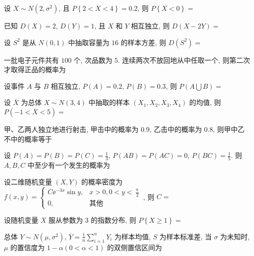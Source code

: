 \begin{ti}
	设 $X\sim N\left(2,\sigma^2\right)$, 且 $P\left\{2<X<4\right\}=0.2$, 则 $P\left\{X<0\right\}=$ \hua{}
\end{ti}

\begin{ti}
	已知 $D(X)=2$, $D(Y)=1$, 且 $X$ 和 $Y$ 相互独立, 则 $D(X-2Y)=$ \hua{}
\end{ti}

\begin{ti}
	设 $S^2$ 是从 $N(0,1)$ 中抽取容量为 $16$ 的样本方差, 则 $D\left(S^2\right)=$ \hua{}
\end{ti}

\begin{ti}
	一批电子元件共有 $100$ 个, 次品数为 $5$. 连续两次不放回地从中任取一个, 则第二次才取得正品的概率为 \hua{}
\end{ti}

\begin{ti}
	设事件 $A$ 与 $B$ 相互独立, $P(A)=0.2$, $P(B)=0.3$, 则 $P\left(A\bigcup B\right)=$ \hua{}
\end{ti}

\begin{ti}
	设 $\overline{X}$ 为总体 $X\sim N(3,4)$ 中抽取的样本 $(X_1,X_2,X_3,X_4)$ 的均值, 则 $P\left(-1<\overline{X}<5\right)=$ \hua{}
\end{ti}

\begin{ti}
	甲、乙两人独立地进行射击, 甲击中的概率为 $0.9$, 乙击中的概率为 $0.8$, 则甲中乙不中的概率等于 \hua{}
\end{ti}

\begin{ti}
	设 $P(A)=P(B)=P(C)=\frac{1}{3}$, $ P(AB)=P(AC)=0$, $ P(BC)=\frac{1}{5}$. 则 $A, B, C$ 中至少有一个发生的概率为 \hua{}
\end{ti}

\begin{ti}
	设二维随机变量 $(X,Y)$ 的概率密度为 $f(x,y)=
	\begin{cases}
	 C\ee^{-3x}\sin y, & x>0, 0<y<\frac{\uppi}{2}\\
	0, & \text{其他}
	\end{cases}
	$, 则 $C=$ \hua{}
\end{ti}

\begin{ti}
	设随机变量 $X$ 服从参数为 $3$ 的指数分布, 则 $P\left\{X\geqslant  1\right\}=$ \hua{}
\end{ti}

\begin{ti}
	总体 $Y\sim N\left(\mu,\sigma^2\right)$, $\overline{Y}=\frac{1}{n}\sum_{i=1}^{n}Y_i$ 为样本均值, $S$ 为样本标准差, 当 $\sigma$ 为未知时, $\mu$ 的置信度为 $1-\alpha (0<\alpha<1)$ 的双侧置信区间为 \hua{}
\end{ti}

